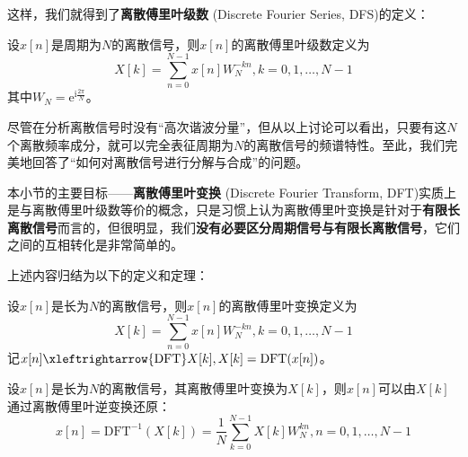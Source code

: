 \documentclass{ctexbook}
\begin{document}
这样，我们就得到了\textbf{离散傅里叶级数} (Discrete Fourier Series, DFS)的定义：
\begin{definition}[离散傅里叶级数]
    设$x[n]$是周期为$N$的离散信号，则$x[n]$的离散傅里叶级数定义为
    \[X[k]=\sum_{n=0}^{N-1}x[n]W_N^{-kn},k=0,1,\dots,N-1\]
    其中$W_N=\mathrm{e}^{\mathrm{i}\frac{2\pi}{N}}$。
\end{definition}

尽管在分析离散信号时没有“高次谐波分量”，但从以上讨论可以看出，只要有这$N$个离散频率成分，就可以完全表征周期为$N$的离散信号的频谱特性。至此，我们完美地回答了“如何对离散信号进行分解与合成”的问题。

本小节的主要目标——\textbf{离散傅里叶变换} (Discrete Fourier Transform, DFT)实质上是与离散傅里叶级数等价的概念，只是习惯上认为离散傅里叶变换是针对于\textbf{有限长离散信号}而言的\cite{dsp}，但很明显，我们\textbf{没有必要区分周期信号与有限长离散信号}，它们之间的互相转化是非常简单的。

上述内容归结为以下的定义和定理：

\begin{definition}[离散傅里叶变换]
    设$x[n]$是长为$N$的离散信号，则$x[n]$的离散傅里叶变换定义为
    \[X[k]=\sum_{n=0}^{N-1}x[n]W_N^{-kn},k=0,1,\dots,N-1\]
    记$x[n]\xleftrightarrow{\text{DFT}}X[k],X[k]=\text{DFT}(x[n])$。
\end{definition}

\begin{theorem}[离散傅里叶反演公式]
    设$x[n]$是长为$N$的离散信号，其离散傅里叶变换为$X[k]$，则$x[n]$可以由$X[k]$通过离散傅里叶逆变换还原：
    \[x[n]=\text{DFT}^{-1}(X[k])=\frac{1}{N}\sum_{k=0}^{N-1}X[k]W_N^{kn},n=0,1,\dots,N-1\]
\end{theorem}
\end{document}
